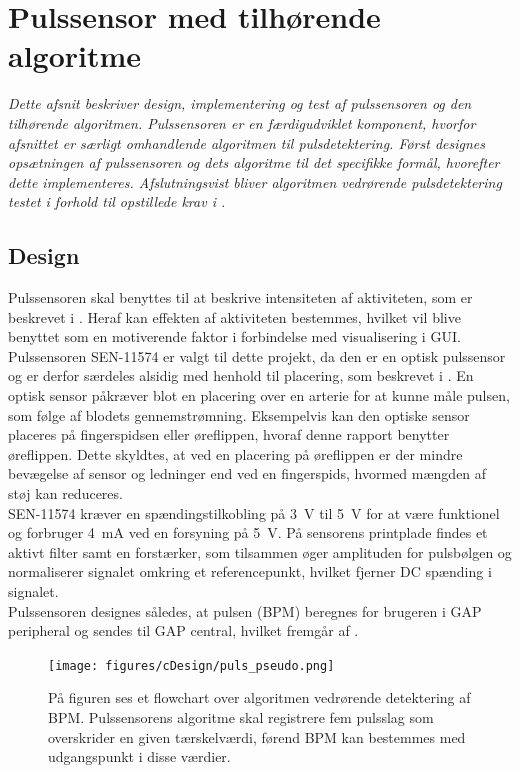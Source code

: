 \section{Pulssensor med tilhørende algoritme}\label{sec_de_im_te_puls}
\textit{Dette afsnit beskriver design, implementering og test af pulssensoren og den tilhørende algoritmen. Pulssensoren er en færdigudviklet komponent, hvorfor afsnittet er særligt omhandlende algoritmen til pulsdetektering. Først designes opsætningen af pulssensoren og dets algoritme til det specifikke formål, hvorefter dette implementeres. Afslutningsvist bliver algoritmen vedrørende pulsdetektering testet i forhold til opstillede krav i .}

\subsection{Design} \label{sec_design_puls}
Pulssensoren skal benyttes til at beskrive intensiteten af aktiviteten, som er beskrevet i . Heraf kan effekten af aktiviteten bestemmes, hvilket vil blive benyttet som en motiverende faktor i forbindelse med visualisering i GUI. \newline
Pulssensoren SEN-11574 er valgt til dette projekt, da den er en optisk pulssensor og er derfor særdeles alsidig med henhold til placering, som beskrevet i . En optisk sensor påkræver blot en placering over en arterie for at kunne måle pulsen, som følge af blodets gennemstrømning. Eksempelvis kan den optiske sensor placeres på fingerspidsen eller øreflippen, hvoraf denne rapport benytter øreflippen. Dette skyldtes, at ved en placering på øreflippen er der mindre bevægelse af sensor og ledninger end ved en fingerspids, hvormed mængden af støj kan reduceres. \\
SEN-11574 kræver en spændingstilkobling på 3~V til 5~V for at være funktionel og forbruger 4~mA ved en forsyning på 5~V. På sensorens printplade findes et aktivt filter samt en forstærker, som tilsammen øger amplituden for pulsbølgen og normaliserer signalet omkring et referencepunkt, hvilket fjerner DC spænding i signalet. \citep{Murphy2016,Murphy2016_sensor}\\
Pulssensoren designes således, at pulsen (BPM) beregnes for brugeren i GAP peripheral og sendes til GAP central, hvilket fremgår af .
\begin{figure}[H]
	\centering
	\texttt{[image: figures/cDesign/puls\_pseudo.png]}
	\caption{På figuren ses et flowchart over algoritmen vedrørende detektering af BPM. Pulssensorens algoritme skal registrere fem pulsslag som overskrider en given tærskelværdi, førend BPM kan bestemmes med udgangspunkt i disse værdier.}
	\label{fig:puls_pseudo}
\end{figure}

